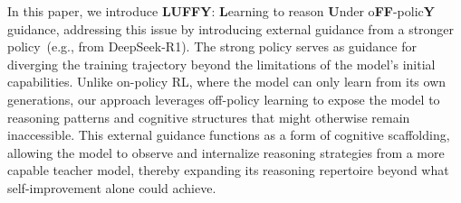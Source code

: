 \documentclass{article}
\begin{document}

In this paper, we introduce \textbf{LUFFY}: \textbf{L}earning to reason \textbf{U}nder o\textbf{FF}-polic\textbf{Y} guidance, addressing this issue by introducing external guidance from a stronger policy~(e.g., from DeepSeek-R1). 
The strong policy serves as guidance for diverging the training trajectory beyond the limitations of the model's initial capabilities. Unlike on-policy RL, where the model can only learn from its own generations, our approach leverages off-policy learning to expose the model to reasoning patterns and cognitive structures that might otherwise remain inaccessible. This external guidance functions as a form of cognitive scaffolding, allowing the model to observe and internalize reasoning strategies from a more capable teacher model, thereby expanding its reasoning repertoire beyond what self-improvement alone could achieve.
\end{document}
